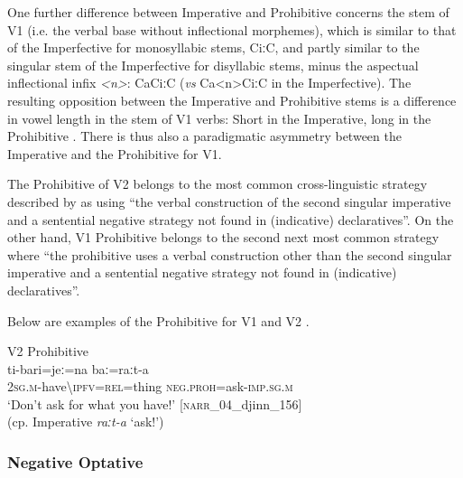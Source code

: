 \documentclass[output=paper,colorlinks,citecolor=brown]{langscibook}
\begin{document}
One further difference between Imperative and Prohibitive concerns the stem of V1 (i.e. the verbal base without inflectional morphemes), which is similar to that of the Imperfective for monosyllabic stems, CiːC, and partly similar to the singular stem of the Imperfective for disyllabic stems, minus the aspectual inflectional infix \textit{<n>}: CaCiːC (\textit{vs} Ca<n>CiːC in the Imperfective). The resulting opposition between the Imperative and Prohibitive stems is a difference in vowel length in the stem of V1 verbs: Short in the Imperative, long in the Prohibitive . There is thus also a paradigmatic asymmetry between the Imperative and the Prohibitive for V1.

The Prohibitive of V2 belongs to the most common cross-linguistic strategy described by \citet{AuweraEtAl2013} as using “the verbal construction of the second singular imperative and a sentential negative strategy not found in (indicative) declaratives”. On the other hand, V1 Prohibitive belongs to the second next most common strategy where “the prohibitive uses a verbal construction other than the second singular imperative and a sentential negative strategy not found in (indicative) declaratives”. 

Below are examples of the Prohibitive for V1  and V2 .


\ea\label{ex:beja:8}
V2 Prohibitive\\
    \gll ti-bari=jeː=na baː=raːt-a\\
     \textsc{2sg.m}{}-have{\textbackslash}\textsc{ipfv=rel}=thing \textsc{neg.proh}=ask-\textsc{imp.sg.m}\\
    \glt `Don’t ask for what you have!’ [\textsc{narr}\_04\_djinn\_156]
    \\ (cp. Imperative \textit{raːt-a} `ask!')
\z

\subsubsection{Negative Optative}
\end{document}

